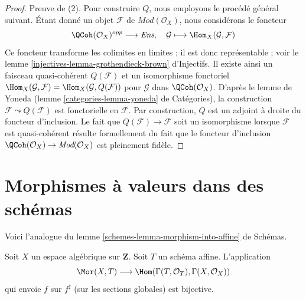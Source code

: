 \begin{proof}
\medskip\noindent
Preuve de (2). Pour construire $Q$, nous employons le procédé général suivant.
Étant donné un objet $\mathcal{F}$ de $\textit{Mod}(\mathcal{O}_X)$,
nous considérons le foncteur
$$
\QCoh(\mathcal{O}_X)^{opp} \longrightarrow \textit{Ens},\quad
\mathcal{G} \longmapsto \Hom_X(\mathcal{G}, \mathcal{F})
$$
Ce foncteur transforme les colimites en limites ;
il est donc représentable ; voir le
lemme \ref{injectives-lemma-grothendieck-brown} d'Injectifs.
Il existe ainsi un faisceau quasi-cohérent $Q(\mathcal{F})$
et un isomorphisme fonctoriel
$\Hom_X(\mathcal{G}, \mathcal{F}) = \Hom_X(\mathcal{G}, Q(\mathcal{F}))$
pour $\mathcal{G}$ dans $\QCoh(\mathcal{O}_X)$. D'après le lemme de Yoneda
(lemme \ref{categories-lemma-yoneda} de Catégories),
la construction $\mathcal{F} \leadsto Q(\mathcal{F})$ est
fonctorielle en $\mathcal{F}$. Par construction, $Q$ est un adjoint à
droite du foncteur d'inclusion.
Le fait que $Q(\mathcal{F}) \to \mathcal{F}$ soit un isomorphisme
lorsque $\mathcal{F}$ est quasi-cohérent résulte formellement du fait
que le foncteur d'inclusion
$\QCoh(\mathcal{O}_X) \to \textit{Mod}(\mathcal{O}_X)$
est pleinement fidèle.
\end{proof}






\section{Morphismes à valeurs dans des schémas}
\label{section-morphisms-to-schemes}

\noindent
Voici l'analogue du
lemme \ref{schemes-lemma-morphism-into-affine} de Schémas.

\begin{lemma}
\label{lemma-morphism-to-affine-scheme}
Soit $X$ un espace algébrique sur $\mathbf{Z}$.
Soit $T$ un schéma affine.
L'application
$$
\Mor(X, T)
\longrightarrow
\Hom(\Gamma(T, \mathcal{O}_T), \Gamma(X, \mathcal{O}_X))
$$
qui envoie $f$ sur $f^\sharp$ (sur les sections globales) est bijective.
\end{lemma}

